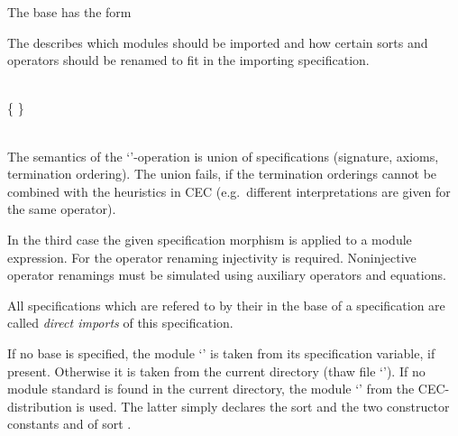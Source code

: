 {The base has the form

\begin{syntax}
 \IS {} 
\end{syntax}

The  describes which modules should be imported and
how certain sorts and operators should be renamed to fit in the 
importing specification.

\begin{syntax}
 \IS {} 
 			\OR {} \kw{+} 
			\OR {} \kw{(}  \kw{)} \END
\\
 \IS {} \{ \kw{,}  \} \END
{}         \IS {}
			 \OR {} \END
\\
      \IS {} \kw{<-}  \END
{} 		   \IS {} \END
\\
   \IS {} \kw{<-}  \END
{}          \IS {} \ts {} \END
\end{syntax}

The semantics of the `\kw{+}'-operation  is union of specifications
(signature, axioms, termination ordering).
The union fails, if the termination orderings cannot be combined
with the heuristics in CEC
(e.g.\ different interpretations are given for the same operator).

In the third case the given specification morphism is applied to a 
module expression.
For the operator renaming injectivity is required. Noninjective
operator renamings must be simulated using auxiliary operators
and equations.

All  specifications which are refered to by their   
in the base of a 
specification are called {\em direct imports} of this specification.


If no base is specified, the module `' is
taken from its specification variable, if present. Otherwise it is taken from
the current directory (thaw file `').
If no module standard is found in the current directory,
the module `' from the CEC-distribution is used.
The latter simply declares the sort  and the two constructor
constants  and  of sort .

}
